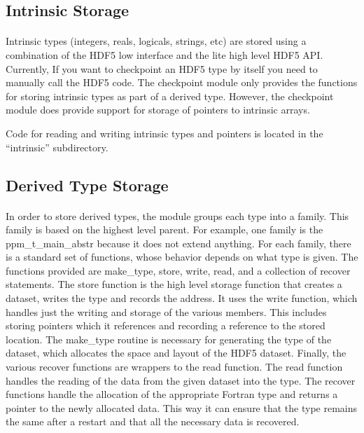 \documentclass{article}
\begin{document}
\subsection{Intrinsic Storage}
\paragraph{}
Intrinsic types (integers, reals, logicals, strings, etc) are stored using a combination of the HDF5 low interface and the lite high level HDF5 API. Currently, If you want to checkpoint an HDF5 type by itself you need to manually call the HDF5 code. The checkpoint module only provides the functions for storing intrinsic types as part of a derived type. However, the checkpoint module does provide support for storage of pointers to intrinsic arrays.

Code for reading and writing intrinsic types and pointers is located in the ``intrinsic'' subdirectory.

\subsection{Derived Type Storage}
\paragraph{}
In order to store derived types, the module groups each type into a family. This family is based on the highest level parent. For example, one family is the ppm\_t\_main\_abstr because it does not extend anything. For each family, there is a standard set of functions, whose behavior depends on what type is given. The functions provided are make\_type, store, write, read, and a collection of recover statements. The store function is the high level storage function that creates a dataset, writes the type and records the address. It uses the write function, which handles just the writing and storage of the various members. This includes storing pointers which it references and recording a reference to the stored location. The make\_type routine is necessary for generating the type of the dataset, which allocates the space and layout of the HDF5 dataset. Finally, the various recover functions are wrappers to the read function. The read function handles the reading of the data from the given dataset into the type. The recover functions handle the allocation of the appropriate Fortran type and returns a pointer to the newly allocated data. This way it can ensure that the type remains the same after a restart and that all the necessary data is recovered.
\end{document}
